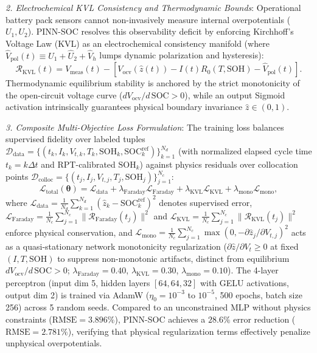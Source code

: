\documentclass[preprint,12pt]{elsarticle}
\begin{document}
\emph{2. Electrochemical KVL Consistency and Thermodynamic Bounds}: Operational battery pack sensors cannot non-invasively measure internal overpotentials ($U_1, U_2$). PINN-SOC resolves this observability deficit by enforcing Kirchhoff's Voltage Law (KVL) as an electrochemical consistency manifold (where $\hat{V}_{\text{pol}}(t) \equiv \hat{U}_1 + \hat{U}_2 + \hat{V}_h$ lumps dynamic polarization and hysteresis):
\begin{equation}\label{eqn:res_kvl}
\mathcal{R}_{\text{KVL}}(t) = V_{\text{meas}}(t) - \left[ V_{\text{ocv}}(\hat{z}(t)) - I(t) R_0(T, \text{SOH}) - \hat{V}_{\text{pol}}(t) \right].
\end{equation}
Thermodynamic equilibrium stability is anchored by the strict monotonicity of the open-circuit voltage curve ($d V_{\text{ocv}}/d\,\text{SOC} > 0$), while an output Sigmoid activation intrinsically guarantees physical boundary invariance $\hat{z} \in (0, 1)$.

\emph{3. Composite Multi-Objective Loss Formulation}: The training loss balances supervised fidelity over labeled tuples $\mathcal{D}_{\text{data}} = \{(t_k, I_k, V_{t,k}, T_k, \text{SOH}_k, \text{SOC}_k^{\text{ref}})\}_{k=1}^{N_d}$ (with normalized elapsed cycle time $t_k = k\Delta t$ and RPT-calibrated $\text{SOH}_k$) against physics residuals over collocation points $\mathcal{D}_{\text{colloc}} = \{(t_j, I_j, V_{t,j}, T_j, \text{SOH}_j)\}_{j=1}^{N_c}$:
\begin{equation}\label{eqn:pinn_loss}
\mathcal{L}_{\text{total}}(\boldsymbol{\theta}) = \mathcal{L}_{\text{data}} + \lambda_{\text{Faraday}} \mathcal{L}_{\text{Faraday}} + \lambda_{\text{KVL}} \mathcal{L}_{\text{KVL}} + \lambda_{\text{mono}} \mathcal{L}_{\text{mono}},
\end{equation}
where $\mathcal{L}_{\text{data}} = \allowbreak \tfrac{1}{N_d} \sum_{k=1}^{N_d} (\hat{z}_k - \text{SOC}_k^{\text{ref}})^2$ denotes supervised error, $\mathcal{L}_{\text{Faraday}} = \allowbreak \tfrac{1}{N_c} \sum_{j=1}^{N_c} \allowbreak \|\mathcal{R}_{\text{Faraday}}(t_j)\|^2$ and $\mathcal{L}_{\text{KVL}} = \allowbreak \tfrac{1}{N_c} \sum_{j=1}^{N_c} \allowbreak \|\mathcal{R}_{\text{KVL}}(t_j)\|^2$ enforce physical conservation, and $\mathcal{L}_{\text{mono}} = \allowbreak \tfrac{1}{N_c}\sum_{j=1}^{N_c} \allowbreak \max(0, -\partial \hat{z}_j/\partial V_{t,j})^2$ acts as a quasi-stationary network monotonicity regularization ($\partial \hat{z}/\partial V_t \ge 0$ at fixed $(I,T,\text{SOH})$ to suppress non-monotonic artifacts, distinct from equilibrium $d V_{\text{ocv}}/d\,\text{SOC} > 0$; $\lambda_{\text{Faraday}} = 0.40$, $\lambda_{\text{KVL}} = 0.30$, $\lambda_{\text{mono}} = 0.10$). The 4-layer perceptron (input dim 5, hidden layers $[64, 64, 32]$ with GELU activations, output dim 2) is trained via AdamW ($\eta_0 = 10^{-3}$ to $10^{-5}$, 500 epochs, batch size 256) across 5 random seeds. Compared to an unconstrained MLP without physics constraints ($\text{RMSE} = 3.896\%$), PINN-SOC achieves a $28.6\%$ error reduction ($\text{RMSE} = 2.781\%$), verifying that physical regularization terms effectively penalize unphysical overpotentials.
\end{document}
